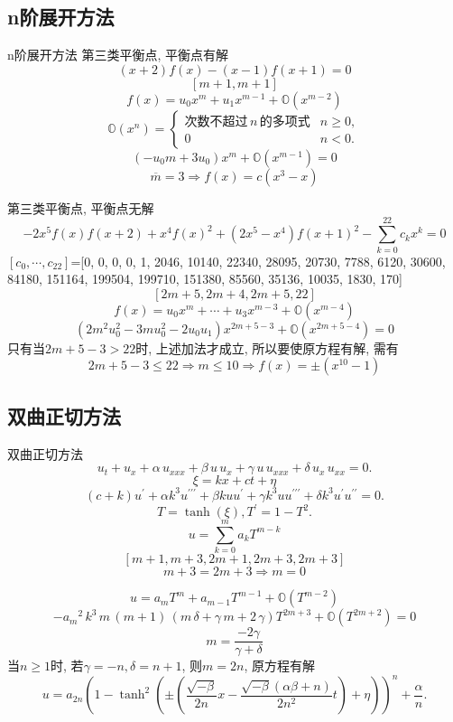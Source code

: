 \documentclass{beamer}
\newcommand{\sbrace}[1]{\left(#1\right)}
\newcommand{\OO}{\ensuremath{\mathbb O}}%
\begin{document}
\subsection{n阶展开方法}
\begin{frame}{n阶展开方法}
第三类平衡点, 平衡点有解 
\[
    (x+2)f(x)-(x-1)f(x+1)=0
\]
\[
    [m+1,m+1]
\]
\pause 
\[
    f(x)=u_0 x^m + u_1 x^{m-1} + \OO(x^{m-2})
\]
\[
    \OO\sbrace{x^n}=\left\{
    \begin{array}{cl}
    \text{次数不超过}\,n\,\text{的多项式} & n\ge 0, \\
    0                                    & n<0 .
    \end{array}
    \right.
\]
\[
    (-u_0 m+3u_0)x^m+\OO(x^{m-1})=0
\]
\[
    \overline{m}=3 \Rightarrow f(x)=c(x^3-x)
\]
\end{frame}

\begin{frame}
第三类平衡点, 平衡点无解
\[
    -2x^5f(x)f(x+2)+x^4f(x)^2+(2x^5-x^4)f(x+1)^2-\sum_{k=0}^{22}{c_k x^k}=0
\]
$[c_0,\cdots,c_{22}]$=[0, 0, 0, 0, 1, 2046, 10140, 22340, 28095, 20730, 7788, 6120, 30600, 84180, 151164, 199504, 199710, 151380, 85560, 35136, 10035, 1830, 170]
\[
    [2m+5,2m+4,2m+5,22]
\]
\[
    f(x)=u_0 x^m +\cdots +u_3 x^{m-3}+\OO(x^{m-4})
\]
\[
    \sbrace{ 2m^2u_0^2-3mu_0^2-2u_0u_1 } x^{2m+5-3}+\OO(x^{2m+5-4})=0
\]
只有当$2m+5-3>22$时, 上述加法才成立, 所以要使原方程有解, 需有
\[
    2m+5-3 \le 22 \Rightarrow m\le 10 \Rightarrow f(x)=\pm (x^{10}-1)
\]
\end{frame}

\subsection{双曲正切方法}
\begin{frame}{双曲正切方法}
\begin{equation*}
{{u}_{t}}+{{u}_{x}}+\alpha\,{{u}_{xxx}}+\beta\,u\,{{u}_{x}}+\gamma\,u\,{{u}_{xxx}}+\delta\,{{u}_{x}}\,{{u}_{xx}}=0. 
\end{equation*}
\[
  \xi=kx+ct+\eta
\]
\[
(c+k)u^\prime + \alpha k^3 u^{\prime\prime\prime}+\beta k u u^\prime+\gamma k^3 u u^{\prime\prime\prime}+\delta k^3 u^\prime u^{\prime\prime} = 0. 
\]
\pause 
\[
  T=\tanh(\xi), T^\prime=1-T^2 . 
\]
\[
  u=\sum_{k=0}^{m}{a_k T^{m-k}}
\]
\pause 
\[
  [m+1,m+3,2m+1,2m+3,2m+3]
\]
\[
  m+3=2m+3\Rightarrow m=0
\]
\end{frame}

\begin{frame}
\[
  u=a_m T^m + a_{m-1} T^{m-1} + \OO(T^{m-2})
\]
\[
  -{{{a}_{m}}}^{2}\,{k}^{3}\,m\,\left( m+1\right) \,\left( m\,\delta+\gamma\,m+2\,\gamma\right)T^{2m+3}+\OO(T^{2m+2})=0
\]
\[
  m=\frac{-2 \gamma}{\gamma+\delta}
\]
当$n\ge 1$时, 若$\gamma=-n,\delta=n+1$, 则$m=2n$, 原方程有解
\begin{equation*}
u=a_{2n} \sbrace{1-\tanh^2\sbrace{\pm\sbrace{\frac{\sqrt{-\beta}}{2n}x-\frac{\sqrt{-\beta}(\alpha\beta+n)}{2n^2}t}+\eta}}^n+\frac{\alpha}{n} . 
\end{equation*}
\end{frame}
\end{document}
